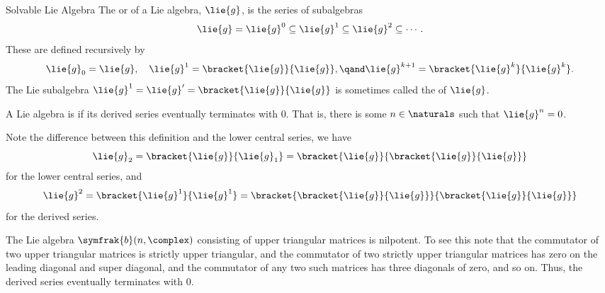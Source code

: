 \documentclass[fleqn]{NotesClass}
\newcommand{\borelLie}{\symfrak{b}}
\begin{document}
    \begin{dfn}{Solvable Lie Algebra}{}
        The  or  of a Lie algebra, \(\lie{g}\), is the series of subalgebras
        \begin{equation}
            \lie{g} = \lie{g}^0 \subseteq \lie{g}^1 \subseteq \lie{g}^2 \subseteq \dotsb.
        \end{equation}
        These are defined recursively by
        \begin{equation}
            \lie{g}_0 = \lie{g}, \quad \lie{g}^1 = \bracket{\lie{g}}{\lie{g}}, \qand \lie{g}^{k+1} = \bracket{\lie{g}^k}{\lie{g}^k}.
        \end{equation}
        The Lie subalgebra \(\lie{g}^1 = \lie{g}' = \bracket{\lie{g}}{\lie{g}}\) is sometimes called the  of \(\lie{g}\).
        
        A Lie algebra is  if its derived series eventually terminates with \(0\).
        That is, there is some \(n \in \naturals\) such that \(\lie{g}^n = 0\).
    \end{dfn}
    
    Note the difference between this definition and the lower central series, we have
    \begin{equation}
        \lie{g}_2 = \bracket{\lie{g}}{\lie{g}_1} = \bracket{\lie{g}}{\bracket{\lie{g}}{\lie{g}}}
    \end{equation}
    for the lower central series, and
    \begin{equation}
        \lie{g}^2 = \bracket{\lie{g}^1}{\lie{g}^1} = \bracket{\bracket{\lie{g}}{\lie{g}}}{\bracket{\lie{g}}{\lie{g}}}
    \end{equation}
    for the derived series.
    
    \begin{exm}{}{}
        The Lie algebra \(\borelLie(n, \complex)\) consisting of upper triangular matrices is nilpotent.
        To see this note that the commutator of two upper triangular matrices is strictly upper triangular, and the commutator of two strictly upper triangular matrices has zero on the leading diagonal and super diagonal, and the commutator of any two such matrices has three diagonals of zero, and so on.
        Thus, the derived series eventually terminates with 0.
    \end{exm}
    
\end{document}
